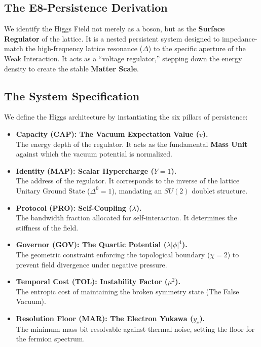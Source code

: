 \subsection{The E8-Persistence Derivation}
We identify the Higgs Field not merely as a boson, but as the \textbf{Surface Regulator} of the lattice. It is a nested persistent system designed to impedance-match the high-frequency lattice resonance ($\Delta$) to the specific aperture of the Weak Interaction. It acts as a ``voltage regulator,'' stepping down the energy density to create the stable \textbf{Matter Scale}.

\subsection{The System Specification}
We define the Higgs architecture by instantiating the six pillars of persistence:

\begin{itemize}
    \item \textbf{Capacity (CAP): The Vacuum Expectation Value ($v$).} \\
    The energy depth of the regulator. It acts as the fundamental \textbf{Mass Unit} against which the vacuum potential is normalized.
    
    \item \textbf{Identity (MAP): Scalar Hypercharge ($Y=1$).} \\
    The address of the regulator. It corresponds to the inverse of the lattice Unitary Ground State ($\Delta^0=1$), mandating an $SU(2)$ doublet structure.
    
    \item \textbf{Protocol (PRO): Self-Coupling ($\lambda$).} \\
    The bandwidth fraction allocated for self-interaction. It determines the stiffness of the field.
    
    \item \textbf{Governor (GOV): The Quartic Potential ($\lambda|\phi|^4$).} \\
    The geometric constraint enforcing the topological boundary ($\chi=2$) to prevent field divergence under negative pressure.
    
    \item \textbf{Temporal Cost (TOL): Instability Factor ($\mu^2$).} \\
    The entropic cost of maintaining the broken symmetry state (The False Vacuum).
    
    \item \textbf{Resolution Floor (MAR): The Electron Yukawa ($y_e$).} \\
    The minimum mass bit resolvable against thermal noise, setting the floor for the fermion spectrum.
\end{itemize}


